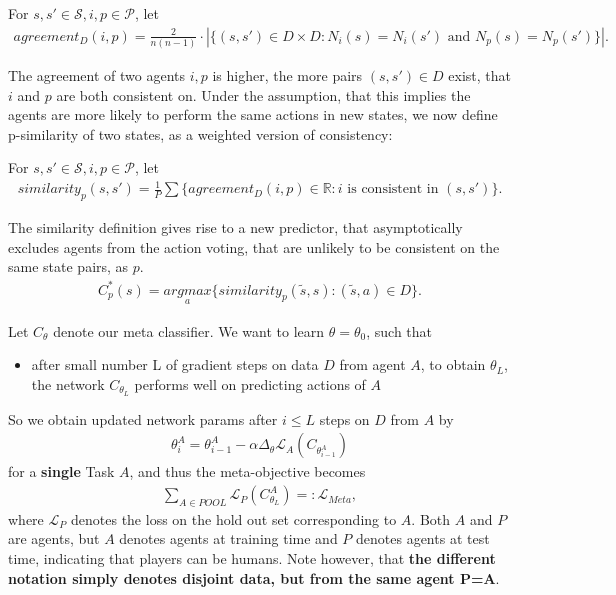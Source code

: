 \documentclass[a4paper, 11pt]{article}
\begin{document}
	\begin{Def}[agreement] {For $s,s'\in\mathcal{S}, i,p\in\mathcal{P}$, let  }
		\begin{align*}
		agreement_D(i,p) =  \frac{2}{n(n-1)}\cdot|\{ (s,s')\in D\times D: N_i(s) = N_i(s') \text{ and } N_p(s) = N_p(s')\}|.
		\end{align*}
	\end{Def}
	The agreement of two agents $i,p$ is higher, the more pairs $(s,s')\in D$ exist, that $i$ and $p$ are both consistent on. Under the assumption, that this implies the agents are more likely to perform the same actions in new states, we now define p-similarity of two states, as a weighted version of consistency:
	

	
	\begin{Def}[p-similarity] {For $s,s'\in\mathcal{S},i,p\in\mathcal{P}$, let  }
		\begin{align}
			similarity_p(s,s') = \frac{1}{P}\sum \{agreement_D(i,p)\in\mathbb{R}: i \text{ is consistent in } (s,s') \}.
		\end{align}
	\end{Def}
	
	The similarity definition gives rise to a new predictor, that asymptotically excludes agents from the action voting, that are unlikely to be consistent on the same state pairs, as $p$.
	\begin{align*}
	C^*_p(s) = \underset{a}{argmax} \{ similarity_p(\tilde{s}, s): (\tilde{s}, a)\in D \}.
	\end{align*}
	
	
	Let $C_{\theta}$ denote our meta classifier. We want to learn $\theta=\theta_0$, such that
	\begin{itemize}
		\item after small number L of gradient steps on data $D$ from agent $A$, to obtain $\theta_L$, the network $C_{\theta_L}$ performs well on predicting actions of $A$
	\end{itemize}
	So we obtain updated network params after $i\leq L$ steps on $D$ from $A$ by
	\begin{align*}
	\theta^A_i = \theta^A_{i-1} - \alpha \Delta_{\theta} \mathcal{L}_A(C_{\theta^A_{i-1}})
	\end{align*} for a \textbf{single} Task $A$, and thus the meta-objective becomes
	\begin{align*}
	\sum_{A \in POOL} \mathcal{L}_{P}(C^A_{\theta_L}) =: \mathcal{L}_{Meta}, 
	\end{align*} where $\mathcal{L}_{P}$ denotes the loss on the hold out set corresponding to $A$. Both $A$ and $P$ are agents, but $A$ denotes agents at training time and $P$ denotes agents at test time, indicating that players can be humans. Note however, that \textbf{the different notation simply denotes disjoint data, but from the same agent P=A}.
	
\end{document}
